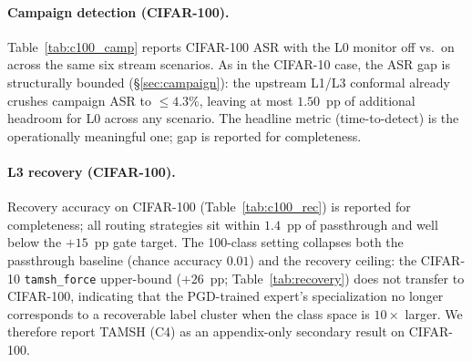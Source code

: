 \paragraph{Campaign detection (CIFAR-100).}
Table~\ref{tab:c100_camp} reports CIFAR-100 ASR with the L0 monitor
off vs.\ on across the same six stream scenarios. As in the CIFAR-10
case, the ASR gap is structurally bounded
(\S\ref{sec:campaign}): the upstream L1/L3 conformal already crushes
campaign ASR to $\le 4.3\%$, leaving at most $1.50$~pp of additional
headroom for L0 across any scenario. The headline metric (time-to-detect)
is the operationally meaningful one; gap is reported for completeness.

\begin{table}[h]
\centering
\small

\caption{%
  CIFAR-100 campaign-stream ASR with L0 off vs.\ on (5 seeds).
  Clean-only false alarm rate is $0.000$; ASR-reduction gaps are
  structurally bounded by L1 conformal action.
}
\label{tab:c100_camp}
\end{table}

\paragraph{L3 recovery (CIFAR-100).}
Recovery accuracy on CIFAR-100 (Table~\ref{tab:c100_rec}) is reported
for completeness; all routing strategies sit within $1.4$~pp of
passthrough and well below the $+15$~pp gate target. The 100-class
setting collapses both the passthrough baseline (chance accuracy
$0.01$) and the recovery ceiling: the CIFAR-10 \texttt{tamsh\_force}
upper-bound ($+26$~pp; Table~\ref{tab:recovery}) does not transfer to
CIFAR-100, indicating that the PGD-trained expert's specialization no
longer corresponds to a recoverable label cluster when the class space
is $10\times$ larger. We therefore report TAMSH (C4) as an
appendix-only secondary result on CIFAR-100.

\begin{table}[h]
\centering
\small

\caption{%
  CIFAR-100 L3 recovery on PGD adversarials (5 seeds pooled).
  All TAMSH strategies sit within $1.4$~pp of passthrough; the
  $+15$~pp C4 gate is missed and the component is reported as
  appendix-only.
}
\label{tab:c100_rec}
\end{table}

